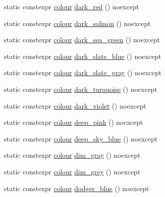 \begin{DoxyCompactItemize}
\item 
static constexpr \mbox{\hyperlink{classmoka_1_1colour}{colour}} \mbox{\hyperlink{classmoka_1_1colour_a2c0fe66d73cef636ae8667b81d1d707c}{dark\+\_\+red}} () noexcept
\item 
static constexpr \mbox{\hyperlink{classmoka_1_1colour}{colour}} \mbox{\hyperlink{classmoka_1_1colour_a024727ccdbca1f7fff9e8504356bcb3e}{dark\+\_\+salmon}} () noexcept
\item 
static constexpr \mbox{\hyperlink{classmoka_1_1colour}{colour}} \mbox{\hyperlink{classmoka_1_1colour_a877558c45f1d9d85231df2dddfd896a0}{dark\+\_\+sea\+\_\+green}} () noexcept
\item 
static constexpr \mbox{\hyperlink{classmoka_1_1colour}{colour}} \mbox{\hyperlink{classmoka_1_1colour_a1b85c3a0e0eb6da70cc17a82f8072e5d}{dark\+\_\+slate\+\_\+blue}} () noexcept
\item 
static constexpr \mbox{\hyperlink{classmoka_1_1colour}{colour}} \mbox{\hyperlink{classmoka_1_1colour_a7570e8f845cb434a44d4101c08382248}{dark\+\_\+slate\+\_\+gray}} () noexcept
\item 
static constexpr \mbox{\hyperlink{classmoka_1_1colour}{colour}} \mbox{\hyperlink{classmoka_1_1colour_a82712d48f1c5a611bffe7c0e8d2195f2}{dark\+\_\+turquoise}} () noexcept
\item 
static constexpr \mbox{\hyperlink{classmoka_1_1colour}{colour}} \mbox{\hyperlink{classmoka_1_1colour_aa106ab839ce65b31b3f58c1b1844a926}{dark\+\_\+violet}} () noexcept
\item 
static constexpr \mbox{\hyperlink{classmoka_1_1colour}{colour}} \mbox{\hyperlink{classmoka_1_1colour_a0821345901f797126f4169eeea3ed75a}{deep\+\_\+pink}} () noexcept
\item 
static constexpr \mbox{\hyperlink{classmoka_1_1colour}{colour}} \mbox{\hyperlink{classmoka_1_1colour_a935483a6bc1930d7d84c6dd0b7f1353f}{deep\+\_\+sky\+\_\+blue}} () noexcept
\item 
static constexpr \mbox{\hyperlink{classmoka_1_1colour}{colour}} \mbox{\hyperlink{classmoka_1_1colour_a9a864e4849feee6ccb73f8f6b95d6dc8}{dim\+\_\+gray}} () noexcept
\item 
static constexpr \mbox{\hyperlink{classmoka_1_1colour}{colour}} \mbox{\hyperlink{classmoka_1_1colour_a92fa8002004604d641f9ba491e7ab17c}{dim\+\_\+grey}} () noexcept
\item 
static constexpr \mbox{\hyperlink{classmoka_1_1colour}{colour}} \mbox{\hyperlink{classmoka_1_1colour_a7699a78883a1ca7228aa6ad708f0d5a6}{dodger\+\_\+blue}} () noexcept
\item 

\end{DoxyCompactItemize}
